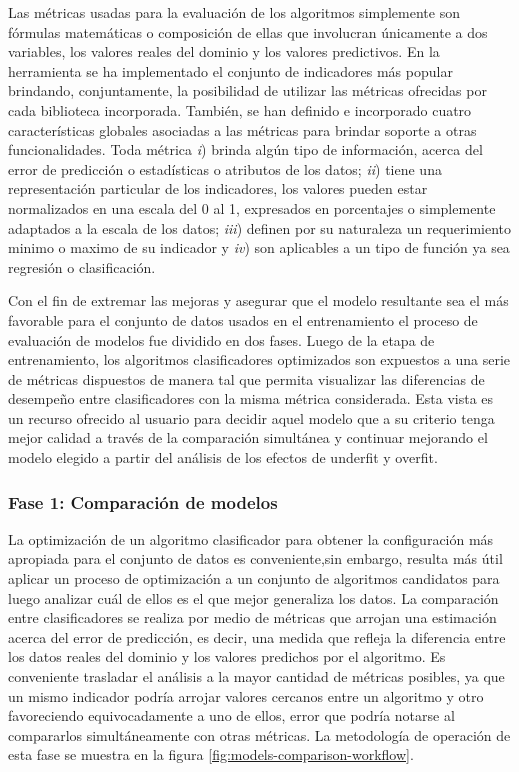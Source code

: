 Las métricas usadas para la evaluación de los algoritmos simplemente
son fórmulas matemáticas o composición de ellas que involucran únicamente
a dos variables, los valores reales del dominio y los valores predictivos.
En la herramienta se ha implementado el conjunto de indicadores más
popular brindando, conjuntamente, la posibilidad de utilizar las métricas
ofrecidas por cada biblioteca incorporada. También, se han definido
e incorporado cuatro características globales asociadas a las métricas
para brindar soporte a otras funcionalidades. Toda métrica \emph{i})
brinda algún tipo de información, acerca del error de predicción o
estadísticas o atributos de los datos; \emph{ii}) tiene una representación
particular de los indicadores, los valores pueden estar normalizados
en una escala del 0 al 1, expresados en porcentajes o simplemente
adaptados a la escala de los datos; \emph{iii}) definen por su naturaleza
un requerimiento minimo o maximo de su indicador y \emph{iv}) son
aplicables a un tipo de función ya sea regresión o clasificación. 

Con el fin de extremar las mejoras y asegurar que el modelo resultante
sea el más favorable para el conjunto de datos usados en el entrenamiento
el proceso de evaluación de modelos fue dividido en dos fases. Luego
de la etapa de entrenamiento, los algoritmos clasificadores optimizados
son expuestos a una serie de métricas dispuestos de manera tal que
permita visualizar las diferencias de desempeño entre clasificadores
con la misma métrica considerada. Esta vista es un recurso ofrecido
al usuario para decidir aquel modelo que a su criterio tenga mejor
calidad a través de la comparación simultánea y continuar mejorando
el modelo elegido a partir del análisis de los efectos de underfit
y overfit. 


\subsubsection*{Fase 1: Comparación de modelos}

La optimización de un algoritmo clasificador para obtener la configuración
más apropiada para el conjunto de datos es conveniente,sin embargo,
resulta más útil aplicar un proceso de optimización a un conjunto
de algoritmos candidatos para luego analizar cuál de ellos es el que
mejor generaliza los datos. La comparación entre clasificadores se
realiza por medio de métricas que arrojan una estimación acerca del
error de predicción, es decir, una medida que refleja la diferencia
entre los datos reales del dominio y los valores predichos por el
algoritmo. Es conveniente trasladar el análisis a la mayor cantidad
de métricas posibles, ya que un mismo indicador podría arrojar valores
cercanos entre un algoritmo y otro favoreciendo equivocadamente a
uno de ellos, error que podría notarse al compararlos simultáneamente
con otras métricas. La metodología de operación de esta fase se muestra
en la figura \ref{fig:models-comparison-workflow}. 

